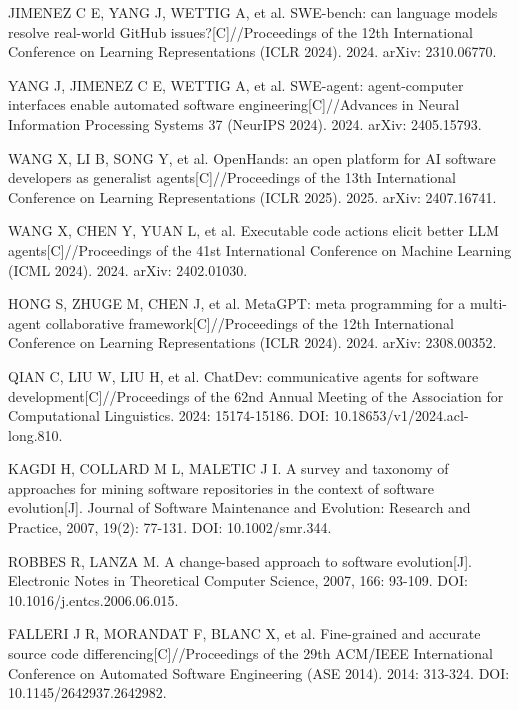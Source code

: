 {\linespread{1}\selectfont
\begin{tjreflist}
  \item JIMENEZ C E, YANG J, WETTIG A, et al. SWE-bench: can language models resolve real-world GitHub issues?[C]//Proceedings of the 12th International Conference on Learning Representations (ICLR 2024). 2024. arXiv: 2310.06770.
  \item YANG J, JIMENEZ C E, WETTIG A, et al. SWE-agent: agent-computer interfaces enable automated software engineering[C]//Advances in Neural Information Processing Systems 37 (NeurIPS 2024). 2024. arXiv: 2405.15793.
  \item WANG X, LI B, SONG Y, et al. OpenHands: an open platform for AI software developers as generalist agents[C]//Proceedings of the 13th International Conference on Learning Representations (ICLR 2025). 2025. arXiv: 2407.16741.
  \item WANG X, CHEN Y, YUAN L, et al. Executable code actions elicit better LLM agents[C]//Proceedings of the 41st International Conference on Machine Learning (ICML 2024). 2024. arXiv: 2402.01030.
  \item HONG S, ZHUGE M, CHEN J, et al. MetaGPT: meta programming for a multi-agent collaborative framework[C]//Proceedings of the 12th International Conference on Learning Representations (ICLR 2024). 2024. arXiv: 2308.00352.
  \item QIAN C, LIU W, LIU H, et al. ChatDev: communicative agents for software development[C]//Proceedings of the 62nd Annual Meeting of the Association for Computational Linguistics. 2024: 15174-15186. DOI: 10.18653/v1/2024.acl-long.810.
  \item KAGDI H, COLLARD M L, MALETIC J I. A survey and taxonomy of approaches for mining software repositories in the context of software evolution[J]. Journal of Software Maintenance and Evolution: Research and Practice, 2007, 19(2): 77-131. DOI: 10.1002/smr.344.
  \item ROBBES R, LANZA M. A change-based approach to software evolution[J]. Electronic Notes in Theoretical Computer Science, 2007, 166: 93-109. DOI: 10.1016/j.entcs.2006.06.015.
  \item FALLERI J R, MORANDAT F, BLANC X, et al. Fine-grained and accurate source code differencing[C]//Proceedings of the 29th ACM/IEEE International Conference on Automated Software Engineering (ASE 2014). 2014: 313-324. DOI: 10.1145/2642937.2642982.

\end{tjreflist}}
